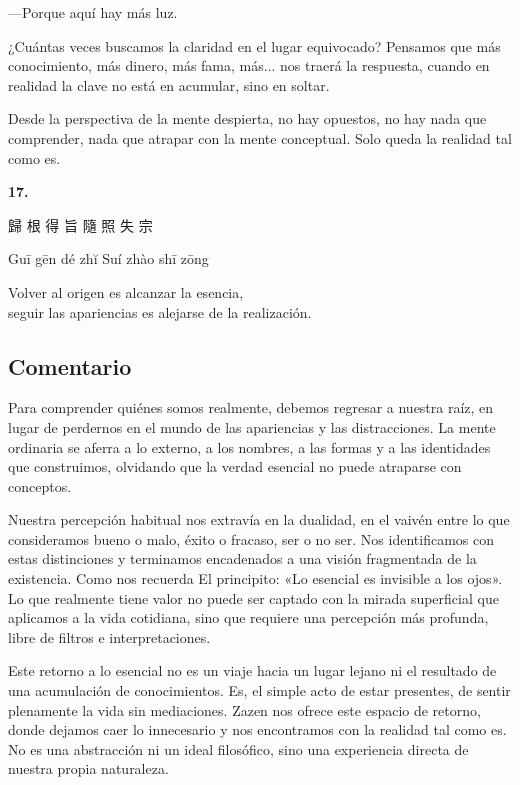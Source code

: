 \documentclass[
  a5paperpaper,
]{article}
\begin{document}
---Porque aquí hay más luz.

¿Cuántas veces buscamos la claridad en el lugar equivocado? Pensamos que
más conocimiento, más dinero, más fama, más... nos traerá la respuesta,
cuando en realidad la clave no está en acumular, sino en soltar.

Desde la perspectiva de la mente despierta, no hay opuestos, no hay nada
que comprender, nada que atrapar con la mente conceptual. Solo queda la
realidad tal como es.

\hfill\break

\hypertarget{02}{}
\begin{verseblock}

\newpage

\begin{center}\textbf{17.}\end{center}

歸 根 得 旨 隨 照 失 宗

Guī gēn dé zhĭ Suí zhào shī zōng

Volver al origen es alcanzar la esencia,\\
seguir las apariencias es alejarse de la realización.

\end{verseblock}

\hfill\break

\hypertarget{comentario-16}{%
\subsection{Comentario}\label{comentario-16}}

Para comprender quiénes somos realmente, debemos regresar a nuestra
raíz, en lugar de perdernos en el mundo de las apariencias y las
distracciones. La mente ordinaria se aferra a lo externo, a los nombres,
a las formas y a las identidades que construimos, olvidando que la
verdad esencial no puede atraparse con conceptos.

Nuestra percepción habitual nos extravía en la dualidad, en el vaivén
entre lo que consideramos bueno o malo, éxito o fracaso, ser o no ser.
Nos identificamos con estas distinciones y terminamos encadenados a una
visión fragmentada de la existencia. Como nos recuerda El principito:
«Lo esencial es invisible a los ojos». Lo que realmente tiene valor no
puede ser captado con la mirada superficial que aplicamos a la vida
cotidiana, sino que requiere una percepción más profunda, libre de
filtros e interpretaciones.

Este retorno a lo esencial no es un viaje hacia un lugar lejano ni el
resultado de una acumulación de conocimientos. Es, el simple acto de
estar presentes, de sentir plenamente la vida sin mediaciones. Zazen nos
ofrece este espacio de retorno, donde dejamos caer lo innecesario y nos
encontramos con la realidad tal como es. No es una abstracción ni un
ideal filosófico, sino una experiencia directa de nuestra propia
naturaleza.
\end{document}
